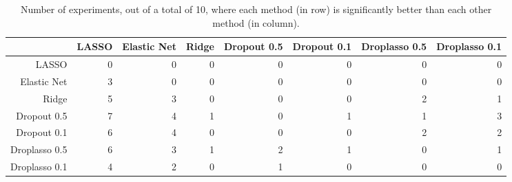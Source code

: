 \begin{table}[ht]
\centering
\begin{tabular}{rrrrrrrr}
  \hline
 & LASSO & Elastic Net & Ridge & Dropout 0.5 & Dropout 0.1 & Droplasso 0.5 & Droplasso 0.1 \\ 
  \hline
LASSO &   0 &   0 &   0 &   0 &   0 &   0 &   0 \\ 
  Elastic Net &   3 &   0 &   0 &   0 &   0 &   0 &   0 \\ 
  Ridge &   5 &   3 &   0 &   0 &   0 &   2 &   1 \\ 
  Dropout 0.5 &   7 &   4 &   1 &   0 &   1 &   1 &   3 \\ 
  Dropout 0.1 &   6 &   4 &   0 &   0 &   0 &   2 &   2 \\ 
  Droplasso 0.5 &   6 &   3 &   1 &   2 &   1 &   0 &   1 \\ 
  Droplasso 0.1 &   4 &   2 &   0 &   1 &   0 &   0 &   0 \\ 
   \hline
\end{tabular}
\caption{Number of experiments, out of a total of 10, where each method (in row) is significantly better than each other method (in column).} 
\end{table}
